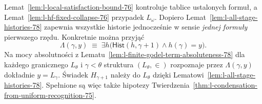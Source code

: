 \begin{uwaga}
\label{rem:l-condensation-scope-76}
Lemat~\ref{lem:l-local-satisfaction-bound-76}
kontroluje tablice ustalonych formuł, a
Lemat~\ref{lem:l-hf-fixed-collapse-76}
przypadek $L_\omega$.
Dopiero Lemat~\ref{lem:l-all-stage-histories-78}
zapewnia wszystkie historie jednocześnie w sensie
\emph{jednej formuły} pierwszego rzędu.
Konkretnie można przyjąć
\[
\Lambda(\gamma,y)\;\equiv\;
 \exists h\bigl(\mathsf{Hist}(h,\gamma+1)
                     \land h(\gamma)=y\bigr).
\]
Na mocy absolutności z
Lematu~\ref{lem:l-finite-godel-term-absoluteness-78}
dla każdego granicznego $L_\theta$ i
$\gamma<\theta$ struktura $(L_\theta,\in)$
rozpoznaje przez $\Lambda(\gamma,y)$ dokładnie
$y=L_\gamma$. Świadek $H_{\gamma+1}$ należy
do $L_\theta$ dzięki
Lematowi~\ref{lem:l-all-stage-histories-78}.
Spełnione są więc także hipotezy
Twierdzenia~\ref{thm:l-condensation-from-uniform-recognition-75}.
\end{uwaga}

